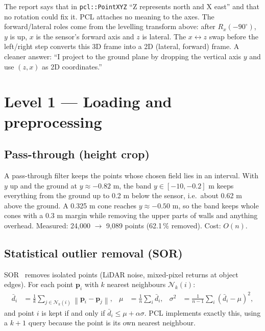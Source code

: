 \documentclass[10pt,a4paper]{scrartcl}
\renewcommand{\emph}[1]{\textcolor{accent}{#1}}
\newcommand{\code}[1]{\texttt{#1}}
\newcommand{\norm}[1]{\left\lVert #1 \right\rVert}
\newcommand{\RuleSection}[1]{%
    \section{#1}%
    \vspace{0.2em}{\color{accent!35}\hrule height 0.4pt}\vspace{0.3em}%
  }
\begin{document}
  \begin{warnbox}
  \small
  The report says that in \code{pcl::PointXYZ} ``Z represents north and X east'' and that
  no rotation could fix it. PCL attaches no meaning to the axes. The forward/lateral roles
  come from the levelling transform above: after $R_x(-90^\circ)$, $y$ is up, $x$ is the
  sensor's forward axis and $z$ is lateral. The $x\leftrightarrow z$ swap before the
  left/right step converts this 3D frame into a 2D (lateral, forward) frame. A cleaner
  answer: ``I project to the ground plane by dropping the vertical axis $y$ and use $(z,x)$
  as 2D coordinates.''
  \end{warnbox}

  \RuleSection{Level 1 --- Loading and preprocessing}
  \label{sec:l1}

  \subsection{Pass-through (height crop)}

  A pass-through filter keeps the points whose chosen field lies in an interval. With
  $y$ up and the ground at $y\approx-0.82$ m, the band $y\in[-10,-0.2]$ m keeps
  everything from the ground up to 0.2 m below the sensor, i.e.\ about 0.62 m above the
  ground. A 0.325 m cone reaches $y\approx-0.50$ m, so the band keeps whole cones
  with a 0.3 m margin while removing the upper parts of walls and anything overhead.
  \emph{Measured: 24,000 $\to$ 9,089 points} (62.1\,\% removed). Cost: $O(n)$.

  \subsection{Statistical outlier removal (SOR)}

  SOR~\citep{rusu2008towards} removes isolated points (LiDAR noise, mixed-pixel
  returns at object edges). For each point $\bm p_i$ with $k$ nearest neighbours
  $\mathcal N_k(i)$:
  \begin{align}
    \bar d_i &= \frac1k\sum_{j\in\mathcal N_k(i)}\norm{\bm p_i-\bm p_j}, &
    \mu &= \frac1n\sum_i\bar d_i, &
    \sigma^2 &= \frac{1}{n-1}\sum_i(\bar d_i-\mu)^2,
  \end{align}
  and point $i$ is kept if and only if $\bar d_i\le\mu+\alpha\sigma$. PCL implements
  exactly this, using a $k\!+\!1$ query because the point is its own nearest
  neighbour.
\end{document}
